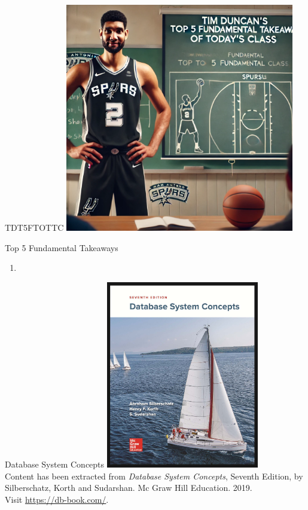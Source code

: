 \documentclass{beamer}
\begin{document}
\begin{frame}{TDT5FTOTTC}
    \centering
    \includegraphics[width=0.75\textwidth]{figures/tim.png}
\end{frame}

\begin{frame}{Top 5 Fundamental Takeaways}
    \small
    \begin{enumerate} \pause
        \item[5]
    \end{enumerate}
\end{frame}

\begin{frame}{Database System Concepts}
    \centering
    \includegraphics[width=0.5\textwidth]{figures/book_cover.jpg} \\
    \vspace{5mm}
    {
        \tiny
        Content has been extracted from \textit{Database System Concepts}, Seventh Edition, by Silberschatz, Korth and Sudarshan. Mc Graw Hill Education. 2019.\\
        Visit \url{https://db-book.com/}.\\
    }
\end{frame}
\end{document}
